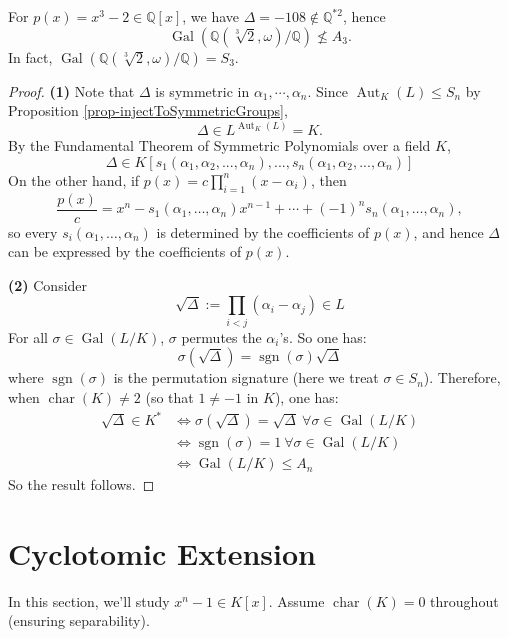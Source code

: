 \begin{example}
For $ p(x) = x^3 - 2 \in \mathbb{Q}[x] $, we have $ \Delta = -108 \notin \mathbb{Q}^{*2} $, hence
$$
\operatorname{Gal}(\mathbb{Q}(\sqrt[3]{2}, \omega)/\mathbb{Q}) \nleq A_3.
$$
In fact, $ \operatorname{Gal}(\mathbb{Q}(\sqrt[3]{2}, \omega)/\mathbb{Q}) = S_3 $.
\end{example}

\begin{proof}
    \textbf{(1)} Note that $\Delta$ is symmetric in $\alpha_1,\cdots,\alpha_n$. Since
$\operatorname{Aut}_K(L)\leq S_n$ by Proposition \ref{prop-injectToSymmetricGroups}, 
    $$\Delta\in L^{\operatorname{Aut}_K(L)} = K.$$ 
    By the Fundamental Theorem of Symmetric Polynomials over a field $K$, \[\Delta \in K[s_1(\alpha_1, \alpha_2, ..., \alpha_n), ..., s_n(\alpha_1, \alpha_2, ..., \alpha_n)]\] 
    On the other hand, if $p(x)=c\prod_{i=1}^{n}(x-\alpha_i)$, then
    \[
    \frac{p(x)}{c}=x^n-s_1(\alpha_1,\dots,\alpha_n)x^{n-1}+\cdots+(-1)^ns_n(\alpha_1,\dots,\alpha_n),
    \]
    so every $s_i(\alpha_1,\dots,\alpha_n)$ is determined by the coefficients of $p(x)$, and hence
    $\Delta$ can be expressed by the coefficients of $p(x)$. 
    
\textbf{(2)} Consider
$$
\sqrt{\Delta} := \prod_{i<j} (\alpha_i - \alpha_j) \in L
$$
For all $\sigma \in \operatorname{Gal}(L/K)$, $\sigma$ permutes the $\alpha_i$'s. So one has:
$$
\sigma(\sqrt{\Delta}) = \operatorname{sgn}(\sigma)\sqrt{\Delta}
$$
where $\operatorname{sgn}(\sigma)$ is the permutation signature (here we treat $\sigma \in S_n$). Therefore, when $\operatorname{char}(K) \neq 2$ (so that $1 \neq -1$ in $K$), one has:
\begin{align*}
    \sqrt{\Delta} \in K^* &\iff \sigma(\sqrt{\Delta}) = \sqrt{\Delta}\ \forall \sigma \in  \operatorname{Gal}(L/K)\\ 
    &\iff \operatorname{sgn}(\sigma) = 1\ \forall \sigma \in \operatorname{Gal}(L/K)\\ 
    &\iff \operatorname{Gal}(L/K) \leq A_n
\end{align*}
So the result follows.
\end{proof}

\section{Cyclotomic Extension}  
In this section, we'll study $ x^n - 1 \in K[x] $. Assume $\operatorname{char}(K) = 0$ throughout (ensuring separability).

